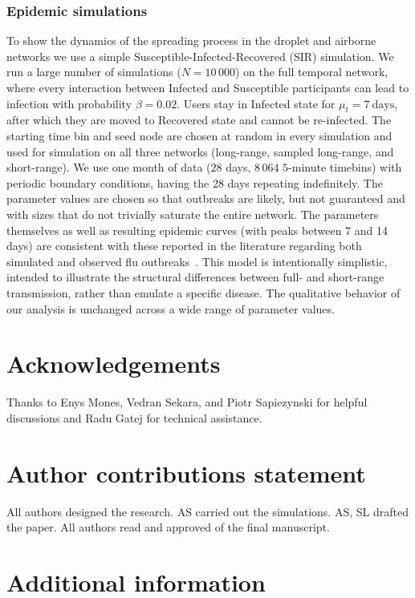\documentclass[fleqn,10pt]{wlscirep}
\begin{document}
\subsubsection*{Epidemic simulations}
To show the dynamics of the spreading process in the droplet and airborne networks we use a simple Susceptible-Infected-Recovered (SIR) simulation.
We run a large number of simulations ($N= 10\,000$) on the full temporal network, where every interaction between Infected and Susceptible participants can lead to infection with probability $\beta = 0.02$.
Users stay in Infected state for $\mu_t = 7\ \mbox{days}$, after which they are moved to Recovered state and cannot be re-infected.
The starting time bin and seed node are chosen at random in every simulation and used for simulation on all three networks (long-range, sampled long-range, and short-range).
We use one month of data ($28$ days, $8\,064$ $5$-minute timebins) with periodic boundary conditions, having the 28 days repeating indefinitely.
The parameter values are chosen so that outbreaks are likely, but not guaranteed and with sizes that do not trivially saturate the entire network.
The parameters themselves as well as resulting epidemic curves (with peaks between 7 and 14 days) are consistent with these reported in the literature regarding both simulated and observed flu outbreaks~\cite{read2008dynamic, salathe2010high, mills2004transmissibility}.
This model is intentionally simplistic, intended to illustrate the structural differences between full- and short-range transmission, rather than emulate a specific disease.
The qualitative behavior of our analysis is unchanged across a wide range of parameter values. 

      

\section*{Acknowledgements}
Thanks to Enys Mones, Vedran Sekara, and Piotr Sapiezynski for helpful discussions and Radu Gatej for technical assistance. 

\section*{Author contributions statement}
All authors designed the research. AS carried out the simulations. AS, SL drafted the paper. All authors read and approved of the final manuscript.

\section*{Additional information}
\end{document}
